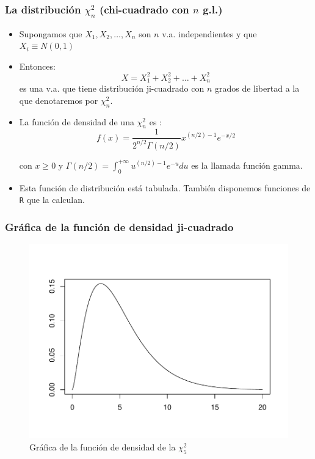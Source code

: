 \begin{frame}
    \frametitle{La distribución $\chi^{2}_{n}$ (chi-cuadrado con $n$ g.l.)}
\begin{itemize}
\item Supongamos que  $X_{1},X_{2},\ldots, X_{n}$ son $n$  v.a. independientes y que $X_{i}\equiv N(0,1)$
\item  Entonces:
$$X=X_{1}^{2}+X_{2}^{2}+\ldots +X_{n}^{2}$$ es una v.a. que tiene distribución ji-cuadrado con $n$ grados de libertad a la que denotaremos por $\chi^{2}_{n}$.
\item La función de densidad de una $\chi^{2}_{n}$  es :
$$f(x)={\frac{1}{2^{n/2} \Gamma (n/2)}} x^{(n/2)-1} e^{-x/2}$$

con $x\geq 0$ y $\Gamma(n/2)=\int_{0}^{+\infty} u^{(n/2)-1}e^{-u}du$ es la llamada función
gamma.
\item Esta función de distribución está tabulada. También disponemos funciones de \texttt{R} que la calculan.
\end{itemize}
\end{frame}

\begin{frame}
\frametitle{Gráfica de la función de densidad ji-cuadrado}
\begin{figure}
\includegraphics{./dibujos/03/-001}
\caption{Gráfica de la función de densidad de la $\chi^2_5$}
\end{figure}



\end{frame}

